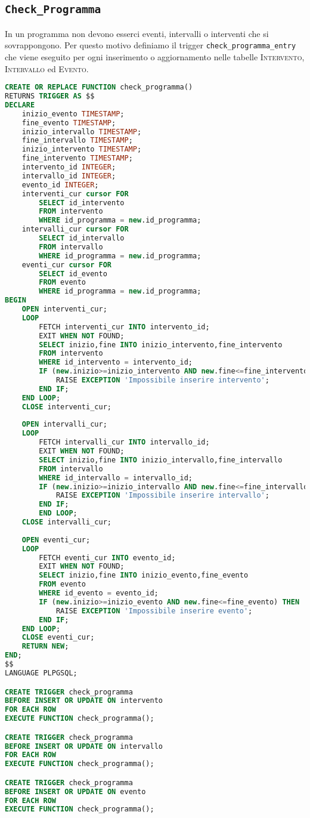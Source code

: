 \subsection{\texttt{Check\_Programma}}
In un programma non devono esserci eventi, intervalli o interventi che si sovrappongono. Per questo motivo definiamo il trigger \texttt{check\_programma\_entry} che viene eseguito per ogni inserimento o aggiornamento nelle tabelle \textsc{Intervento}, \textsc{Intervallo} ed \textsc{Evento}.
\begin{lstlisting}[language=SQL,style=mystyle,caption={check\_programma\_entry}]
CREATE OR REPLACE FUNCTION check_programma() 
RETURNS TRIGGER AS $$
DECLARE
	inizio_evento TIMESTAMP;
	fine_evento TIMESTAMP;
	inizio_intervallo TIMESTAMP;
	fine_intervallo TIMESTAMP;
	inizio_intervento TIMESTAMP;
	fine_intervento TIMESTAMP;
	intervento_id INTEGER;
	intervallo_id INTEGER;
	evento_id INTEGER;
	interventi_cur cursor FOR 
		SELECT id_intervento 
		FROM intervento 
		WHERE id_programma = new.id_programma;
	intervalli_cur cursor FOR 
		SELECT id_intervallo 
		FROM intervallo 
		WHERE id_programma = new.id_programma;
	eventi_cur cursor FOR 
		SELECT id_evento 
		FROM evento 
		WHERE id_programma = new.id_programma;
BEGIN
	OPEN interventi_cur;
	LOOP 
		FETCH interventi_cur INTO intervento_id;
		EXIT WHEN NOT FOUND;
		SELECT inizio,fine INTO inizio_intervento,fine_intervento
		FROM intervento
		WHERE id_intervento = intervento_id;
		IF (new.inizio>=inizio_intervento AND new.fine<=fine_intervento) THEN
			RAISE EXCEPTION 'Impossibile inserire intervento';
		END IF;
	END LOOP;
	CLOSE interventi_cur;
	
	OPEN intervalli_cur;
	LOOP 
		FETCH intervalli_cur INTO intervallo_id;
		EXIT WHEN NOT FOUND;
		SELECT inizio,fine INTO inizio_intervallo,fine_intervallo
		FROM intervallo
		WHERE id_intervallo = intervallo_id;
		IF (new.inizio>=inizio_intervallo AND new.fine<=fine_intervallo) THEN
			RAISE EXCEPTION 'Impossibile inserire intervallo';
		END IF;
		END LOOP;
	CLOSE intervalli_cur;
	
	OPEN eventi_cur;
	LOOP 
		FETCH eventi_cur INTO evento_id;
		EXIT WHEN NOT FOUND;
		SELECT inizio,fine INTO inizio_evento,fine_evento
		FROM evento
		WHERE id_evento = evento_id;
		IF (new.inizio>=inizio_evento AND new.fine<=fine_evento) THEN
			RAISE EXCEPTION 'Impossibile inserire evento';
		END IF;
	END LOOP;
	CLOSE eventi_cur;
	RETURN NEW;
END;
$$ 
LANGUAGE PLPGSQL;

CREATE TRIGGER check_programma
BEFORE INSERT OR UPDATE ON intervento
FOR EACH ROW
EXECUTE FUNCTION check_programma();

CREATE TRIGGER check_programma
BEFORE INSERT OR UPDATE ON intervallo
FOR EACH ROW
EXECUTE FUNCTION check_programma();

CREATE TRIGGER check_programma
BEFORE INSERT OR UPDATE ON evento
FOR EACH ROW
EXECUTE FUNCTION check_programma();
\end{lstlisting}


